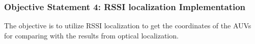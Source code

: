 \documentclass[11pt]{article}
\begin{document}
\begin{itemize}

        \end{itemize}

        \subsubsection{Objective Statement 4: RSSI localization Implementation}
        The objective is to utilize RSSI localization to get the coordinates of the AUVs for comparing with the results from optical localization.
\end{document}
